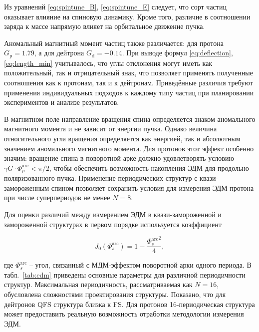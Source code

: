 \par Из уравнений \ref{eq:spintune_B}, \ref{eq:spintune_E} следует, что сорт частиц оказывает влияние на спиновую динамику. Кроме того, различие в соотношении заряда к массе напрямую влияет на орбитальное движение пучка.

\par Аномальный магнитный момент частиц также различается: для протона $G_{\textrm{p}} = 1.79$, а для дейтрона $G_{\textrm{d}} = -0.14$. При выводе формул \ref{eq:deflection}, \ref{eq:length_min} учитывалось, что углы отклонения могут иметь как положительный, так и отрицательный знак, что позволяет применять полученные соотношения как к протонам, так и к дейтронам. Приведённые различия требуют применения индивидуальных подходов к каждому типу частиц при планировании экспериментов и анализе результатов.

\par В магнитном поле направление вращения спина определяется знаком аномального магнитного момента и не зависит от энергии пучка. Однако величина относительного угла вращения определяется как энергией, так и абсолютным значением аномального магнитного момента. Для протонов этот эффект особенно значим: вращение спина в поворотной арке должно удовлетворять условию $\gamma G \cdot \Phi_{p}^{\text{arc}} < \pi/2$, чтобы обеспечить возможность накопления ЭДМ для продольно поляризованного пучка. Применение периодических структур с квази-замороженным спином позволяет сохранить условия для измерения ЭДМ протона при числе суперпериодов не менее $N = 8$.
\par Для оценки различий между измерением ЭДМ в квази-замороженной и замороженной структурах в первом порядке используется коэффициент \cite{Senichev:2023_nuclotron} 

\begin{equation}
	J_{0}(\Phi_s^{\textrm{arc}})=1-\frac{{\Phi_s^{\textrm{arc}}}^2}{4},
	\label{eq:edm}
\end{equation}

\noindent где $\Phi_s^{\textrm{arc}}$ -- угол, связанный с МДМ-эффектом поворотной арки одного периода. В табл.~\ref{tab:edm} приведены основные параметры для различной периодичности структур. Максимальная периодичность, рассматриваемая как $N=16$, обусловлена сложностями проектирования структуры. Показано, что для дейтронов QFS структура близка к FS. Для протонов 16-периодическая структура может предоставить реальную возможность отработки методологии измерения ЭДМ.

